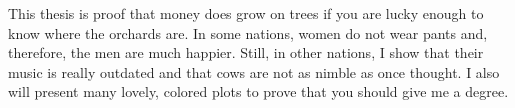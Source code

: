 This thesis is proof that money does grow on trees if you are lucky
enough to know where the orchards are.  In some nations, women do not
wear pants and, therefore, the men are much happier.  Still, in other
nations, I show that their music is really outdated and that cows are
not as nimble as once thought.  I also will present many lovely,
colored plots to prove that you should give me a degree.
